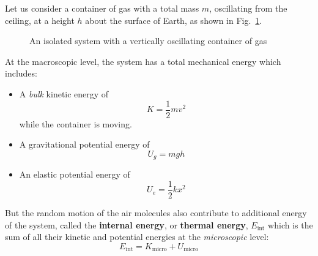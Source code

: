 Let us consider a container of gas with a total mass $m$, oscillating from the
ceiling, at a height $h$ about the surface of Earth, as shown in
Fig.~\ref{fig:big-system}.
\begin{figure}[ht]
  \centering
  
  \caption{An isolated system with a vertically oscillating container of gas}
  \label{fig:big-system}
\end{figure}
At the macroscopic level, the system has a total mechanical energy which
includes:
\begin{itemize}
\item A \emph{bulk} kinetic energy of
  \begin{equation*}
    K=\dfrac12 mv^2
  \end{equation*}
  while the container is moving.
  
\item A gravitational potential energy of
  \begin{equation*}
    U_g=mgh
  \end{equation*}

\item An elastic potential energy of
  \begin{equation*}
    U_e=\frac12kx^2
  \end{equation*}
\end{itemize}
%
%  
%    
%
But the random motion of the air molecules also contribute to additional energy
of the system, called the \textbf{internal energy}, or \textbf{thermal energy},
$E_\text{int}$ which is the sum of all their kinetic and potential energies at
the \emph{microscopic} level:
\begin{equation}
  \boxed{
    E_\text{int}=K_\text{micro} + U_\text{micro}
  }
\end{equation}
%  
%
%
%
%
